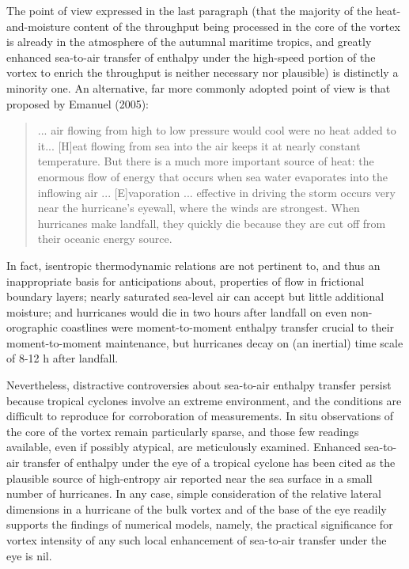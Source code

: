 \documentclass[preprint, prX]{revtex4}
\begin{document}
The point of view expressed in the last paragraph (that the majority of the heat-and-moisture content of the throughput being processed in the core of the vortex is already in the atmosphere of the autumnal maritime tropics, and greatly enhanced sea-to-air transfer of enthalpy under the high-speed portion of the vortex to enrich the throughput is neither necessary nor plausible) is distinctly a minority one. An alternative, far more commonly adopted point of view is that proposed by Emanuel (2005):

\begin{quote}
... air flowing from high to low pressure would cool were no heat added to it... [H]eat flowing from sea into the air keeps it at nearly constant temperature. But there is a much more important source of heat: the enormous flow of energy that occurs when sea water evaporates into the inflowing air ... [E]vaporation ... effective in driving the storm occurs very near the hurricane’s eyewall, where the winds are strongest. When hurricanes make landfall, they quickly die because they are cut off from their oceanic energy source.
\end{quote}

In fact, isentropic thermodynamic relations are not pertinent to, and thus an inappropriate basis for anticipations about, properties of flow in frictional boundary layers; nearly saturated sea-level air can accept but little additional moisture; and hurricanes would die in two hours after landfall on even non-orographic coastlines were moment-to-moment enthalpy transfer crucial to their moment-to-moment maintenance, but hurricanes decay on (an inertial) time scale of 8-12 h after landfall.

Nevertheless, distractive controversies about sea-to-air enthalpy transfer persist because tropical cyclones involve an extreme environment, and the conditions are difficult to reproduce for corroboration of measurements. In situ observations of the core of the vortex remain particularly sparse, and those few readings available, even if possibly atypical, are meticulously examined. Enhanced sea-to-air transfer of enthalpy under the eye of a tropical cyclone has been cited as the plausible source of high-entropy air reported near the sea surface in a small number of hurricanes. In any case, simple consideration of the relative lateral dimensions in a hurricane of the bulk vortex and of the base of the eye readily supports the findings of numerical models, namely, the practical significance for vortex intensity of any such local enhancement of sea-to-air transfer under the eye is nil.
\end{document}
